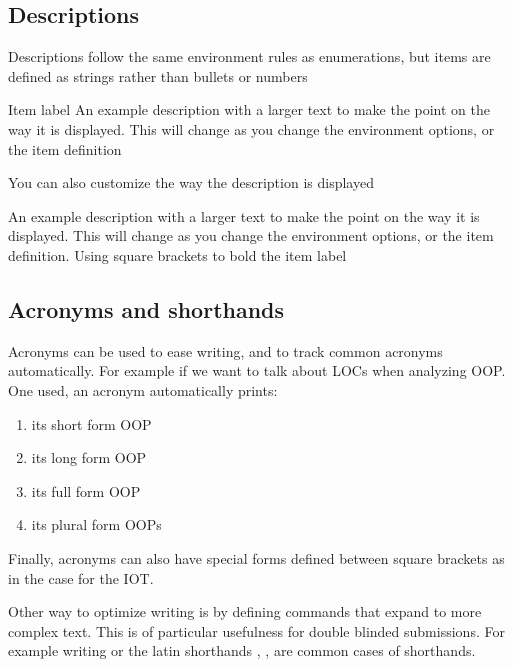 \subsection{Descriptions}
\label{sec:descriptions}


Descriptions follow the same environment rules as enumerations, but items are defined as strings rather than bullets or numbers

\begin{description}
  \item{Item label} An example description with a larger text to make the point on the way it is displayed. This will change as you change the environment options, or the item definition
\end{description}

You can also customize the way the description is displayed
\begin{description}[labelindent=1cm]
  \item[Item label] An example description with a larger text to make the point on the way it is displayed. This will change as you change the environment options, or the item definition. Using square brackets to bold the item label 
\end{description}


\subsection{Acronyms and shorthands}
\label{sec:acrosnyms}

Acronyms can be used to ease writing, and to track common acronyms automatically. For example if we want to talk about \acp{LOC} when analyzing \ac{OOP}. One used, an acronym automatically prints:
\begin{enumerate}
  \item its short form \ac{OOP}
  \item its long form \acl{OOP}
  \item its full form \acf{OOP}
  \item its plural form \acp{OOP}
\end{enumerate}

Finally, acronyms can also have special forms defined between square brackets as in the case for the \ac{IOT}. 

Other way to optimize writing is by defining commands that expand to more complex text. This is of particular usefulness for double blinded submissions. For example writing \js or the latin shorthands \ie, \eg, \cf are common cases of shorthands.



\endinput
